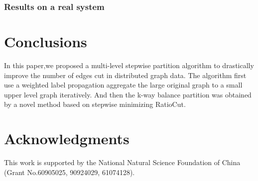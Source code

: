 \documentclass{acm_proc_article-sp}
\begin{document}
\subsubsection {Results on a real system}

\section{Conclusions}
In this paper,we proposed a multi-level stepwise partition algorithm to drastically improve the number of edges cut in distributed graph data. The algorithm first use a weighted label propagation aggregate the large original graph to a small upper level graph iteratively. And then the k-way balance partition was obtained by a novel method based on stepwise minimizing RatioCut.

\section{Acknowledgments}
This work is supported by the National Natural Science Foundation of China (Grant No.60905025, 90924029, 61074128).

%

%
%
\balancecolumns
\end{document}

